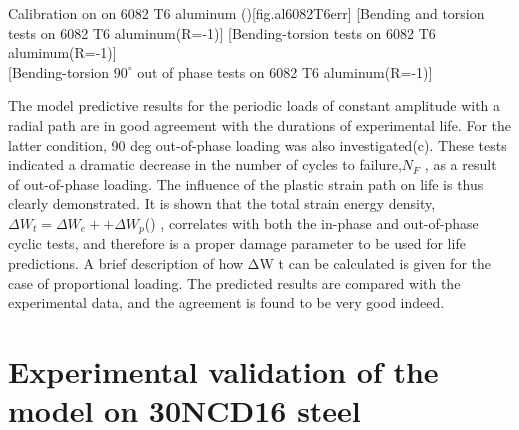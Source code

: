 \begin{Figure}[]{Calibration on on 6082 T6 aluminum (\cite{susmel2003multiaxial})}[fig.al6082T6err]
[Bending and torsion tests on 6082 T6 aluminum(R=-1)]
[Bending-torsion tests on 6082 T6 aluminum(R=-1)]
\\
[Bending-torsion $90^\circ$ out of phase tests on 6082 T6 aluminum(R=-1)]
\end{Figure}

The model predictive results for the periodic loads of constant amplitude with a radial path are in good agreement with the durations of experimental life. For the latter condition, 90 deg out-of-phase loading was also investigated(c). These tests indicated a dramatic decrease in the number of cycles to failure,$N_F$ , as a result of out-of-phase loading. The influence of the plastic strain path on life is thus clearly demonstrated. It is shown that the total strain energy density, $ΔW_t = ΔW_e+ + ΔW_p$(\cite{ellyin1991phase}) , correlates with both the in-phase and out-of-phase cyclic tests, and therefore is a proper damage parameter to be used for life predictions. A brief description of how ΔW t can be calculated is given for the case of proportional loading. The predicted results are compared with the experimental data, and the agreement is found to be very good indeed.



\clearpage
\section{Experimental validation of the model on 30NCD16 steel}
